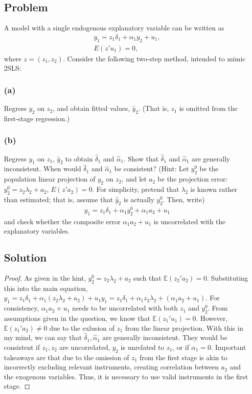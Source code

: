 \documentclass[10pt, a4paper]{article}
\newcommand{\EE}{\mathbb E}
\begin{document}
  \subsection*{Problem}
    A model with a single endogenous explanatory variable can be written as
    \begin{gather}
      y_1 = z_1 \delta_1 + \alpha_1 y_2 + u_1, \\
      E(z'u_1) = 0,
    \end{gather}
    where $z = (z_1, z_2)$. Consider the following two-step method, intended to mimic 2SLS:
  \subsubsection*{(a)}
    Regress $y_2$ on $z_2$, and obtain fitted values, $\hat{y}_2$. (That is, $z_1$ is omitted from the first-stage regression.)
  \subsubsection*{(b)}
    Regress $y_1$ on $z_1$, $\hat{y}_2$ to obtain $\hat{\delta}_1$ and $\hat{\alpha}_1$. Show that $\hat{\delta}_1$ and $\hat{\alpha}_1$ are generally inconsistent. When would $\hat{\delta}_1$ and $\hat{\alpha}_1$ be consistent? (Hint: Let $y_2^0$ be the population linear projection of $y_2$ on $z_2$, and let $a_2$ be the projection error: $y_2^0 = z_2 \lambda_2 + a_2$, $E(z'a_2) = 0$. For simplicity, pretend that $\lambda_2$ is known rather than estimated; that is, assume that $\hat{y}_2$ is actually $y_2^0$. Then, write)
    \begin{gather}
      y_1 = z_1 \delta_1 + \alpha_1 y_2^0 + \alpha_1 a_2 + u_1
    \end{gather}
    and check whether the composite error $\alpha_1 a_2 + u_1$ is uncorrelated with the explanatory variables.
  \subsection*{Solution}
    \begin{proof}
      As given in the hint, $y_2^0 = z_2\lambda_2 + a_2$ such that $\EE(z_2'a_2)=0$. Substituting this into the main equation, $y_1 = z_1\delta_1+\alpha_1(z_2\lambda_2+a_2)+u_1y_1 = z_1\delta_1 + \alpha_1z_2\lambda_2 + (\alpha_1a_2+u_1)$. For consistency, $\alpha_1a_2 + u_1$ needs to be uncorrelated with both $z_1$ and $y_2^0$. From assumptions given in the question, we know that $\EE(z_1'u_1)=0$. However, $\EE(z_1'a_2)\ne0$ due to the exlusion of $z_1$ from the linear projection. With this in my mind, we can say that $\hat{\delta}_1,\hat{\alpha}_1$ are generally inconsistent. They would be consistent if $z_1, z_2$ are uncorrelated, $y_2$ is unrelated to $z_1$, or if $\alpha_1=0$. Important takeaways are that due to the omission of $z_1$ from the first stage is akin to incorrectly excluding relevant instruments, creating correlation between $a_2$ and the exogenous variables. Thus, it is necessary to use valid instruments in the first stage. 
    \end{proof}
\end{document}
